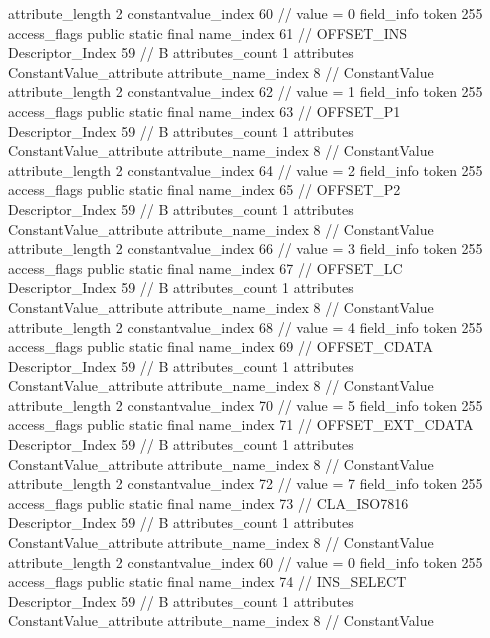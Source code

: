 {{{{{{{					attribute_length	2
					constantvalue_index	60		// value = 0
				}
				}
			}
			field_info {
				token	255
				access_flags	public static final
				name_index	61		// OFFSET_INS
				Descriptor_Index	59		// B
				attributes_count	1
				attributes {
				ConstantValue_attribute {
					attribute_name_index	8		// ConstantValue
					attribute_length	2
					constantvalue_index	62		// value = 1
				}
				}
			}
			field_info {
				token	255
				access_flags	public static final
				name_index	63		// OFFSET_P1
				Descriptor_Index	59		// B
				attributes_count	1
				attributes {
				ConstantValue_attribute {
					attribute_name_index	8		// ConstantValue
					attribute_length	2
					constantvalue_index	64		// value = 2
				}
				}
			}
			field_info {
				token	255
				access_flags	public static final
				name_index	65		// OFFSET_P2
				Descriptor_Index	59		// B
				attributes_count	1
				attributes {
				ConstantValue_attribute {
					attribute_name_index	8		// ConstantValue
					attribute_length	2
					constantvalue_index	66		// value = 3
				}
				}
			}
			field_info {
				token	255
				access_flags	public static final
				name_index	67		// OFFSET_LC
				Descriptor_Index	59		// B
				attributes_count	1
				attributes {
				ConstantValue_attribute {
					attribute_name_index	8		// ConstantValue
					attribute_length	2
					constantvalue_index	68		// value = 4
				}
				}
			}
			field_info {
				token	255
				access_flags	public static final
				name_index	69		// OFFSET_CDATA
				Descriptor_Index	59		// B
				attributes_count	1
				attributes {
				ConstantValue_attribute {
					attribute_name_index	8		// ConstantValue
					attribute_length	2
					constantvalue_index	70		// value = 5
				}
				}
			}
			field_info {
				token	255
				access_flags	public static final
				name_index	71		// OFFSET_EXT_CDATA
				Descriptor_Index	59		// B
				attributes_count	1
				attributes {
				ConstantValue_attribute {
					attribute_name_index	8		// ConstantValue
					attribute_length	2
					constantvalue_index	72		// value = 7
				}
				}
			}
			field_info {
				token	255
				access_flags	public static final
				name_index	73		// CLA_ISO7816
				Descriptor_Index	59		// B
				attributes_count	1
				attributes {
				ConstantValue_attribute {
					attribute_name_index	8		// ConstantValue
					attribute_length	2
					constantvalue_index	60		// value = 0
				}
				}
			}
			field_info {
				token	255
				access_flags	public static final
				name_index	74		// INS_SELECT
				Descriptor_Index	59		// B
				attributes_count	1
				attributes {
				ConstantValue_attribute {
					attribute_name_index	8		// ConstantValue
}}}}}}}
